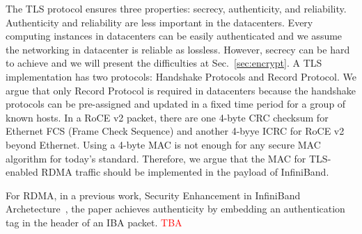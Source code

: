 The TLS protocol ensures three properties: secrecy, authenticity, and reliability. Authenticity and reliability are less important in the datacenters. Every computing instances in datacenters can be easily authenticated and we assume the networking in datacenter is reliable as lossless. However, secrecy can be hard to achieve and we will present the difficulties at Sec.~\ref{sec:encrypt}. A TLS implementation has two protocols: Handshake Protocols and Record Protocol. We argue that only Record Protocol is required in datacenters because the handshake protocols can be pre-assigned and updated in a fixed time period for a group of known hosts. In a RoCE v2 packet, there are one 4-byte CRC checksum for Ethernet FCS (Frame Check Sequence) and another 4-byye ICRC for RoCE v2 beyond Ethernet. Using a 4-byte MAC is not enough for any secure MAC algorithm for today's standard. Therefore, we argue that the MAC for TLS-enabled RDMA traffic should be implemented in the payload of InfiniBand.

For RDMA, in a previous work, Security Enhancement in InfiniBand Archetecture~\cite{Lee:2005:SEI:1053727.1054449}, the paper achieves authenticity by embedding an authentication tag in the
header of an IBA packet. \textcolor{red}{TBA}
